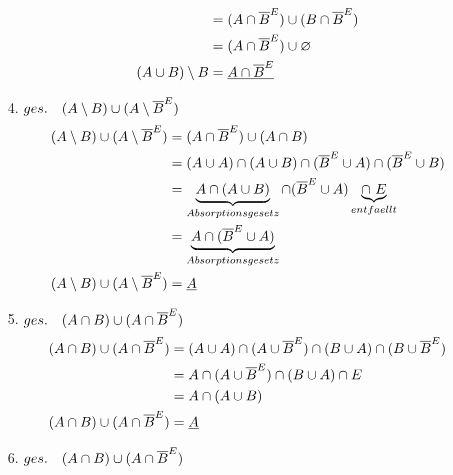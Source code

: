 \begin{itemize}[leftmargin=*]
\begin{align*}
                                                   & = (A \cap \overline{B}^E) \cup (B \cap \overline{B}^E) \\
                                                   & = (A \cap \overline{B}^E) \cup \varnothing \\
                            (A \cup B) \setminus B & = \underline{A \cap \overline{B}^E} \\                      
                        \end{align*}
                    \item[4.] $ges.\quad (A \setminus B) \cup (A \setminus \overline{B}^E)$ %
                        \begin{align*}
                            (A \setminus B) \cup (A \setminus \komplement{B}) & = (A \cap \komplement{B}) \cup (A \cap B) \\
                            & = (A \cup A) \cap (A \cup B) \cap (\komplement{B} \cup A) \cap (\komplement{B} \cup B) \\
                            & = \underbrace{A \cap (A \cup B)}_{Absorptionsgesetz} \cap (\komplement{B} \cup A) \underbrace{\cap \ E}_{entfaellt} \\
                            & = \underbrace{A \cap (\komplement{B} \cup A)}_{Absorptionsgesetz} \\
                            (A \setminus B) \cup (A \setminus \komplement{B}) & = \underline{A} \\
                        \end{align*}
                    \item[5.] $ges.\quad (A \cap B) \cup (A \cap \overline{B}^E)$  
                        \begin{align*}
                            (A \cap B) \cup (A \cap \overline{B}^E) & = (A \cup A) \cap (A \cup \overline{B}^E) \cap (B \cup A) \cap (B \cup \overline{B}^E) \\
                                                                    & = A \cap (A \cup \overline{B}^E) \cap (B \cup A) \cap E \\
                                                                    & = A \cap (A \cup B) \\
                            (A \cap B) \cup (A \cap \overline{B}^E) & = \underline{A}                                       
                        \end{align*}
                    \item[6.] $ges.\quad (A \cap B) \cup (A \cap \overline{B}^E)$  

\end{itemize}
